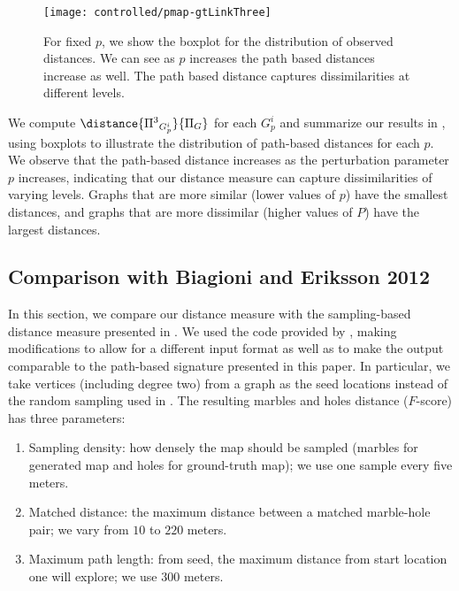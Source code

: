 \begin{figure}[ht]
\centering
\texttt{[image: controlled/pmap-gtLinkThree]}
\caption{For fixed $p$, we show the boxplot for the
distribution of observed distances. We can see as $p$ increases the path based
distances increase as well. The path based distance captures dissimilarities at
different levels.
\label{fig-controlled_result}}
\end{figure}
We compute $\distance{{\Pi^3}_{G_p^i}}{\Pi_G}$ for each $G_p^i$ and  summarize
our results in , using boxplots to illustrate the
distribution of path-based distances for each $p$. We observe that
the path-based 
distance   increases as the perturbation parameter $p$ increases, indicating 
that our distance measure can capture dissimilarities of varying
levels. Graphs that are more similar (lower values of $p$) have the smallest distances, and graphs that are more dissimilar (higher values of $P$) have the largest distances. 










\subsection{Comparison with {Biagioni and Eriksson 2012}}
\label{subsec-comparejames}
In this section, we compare our distance measure with the sampling-based
distance measure presented in
.  We used the code provided
by , making
modifications to allow for a different input format as well as to make the
output comparable to the path-based signature presented in this
paper.  In particular, we take vertices (including degree
two) from a graph as the seed locations
instead of the random sampling used in \cite{Biagioni:2012:MIF:2424321.2424333}.
The resulting marbles and holes distance ($F$-score) has three
parameters:
\begin{enumerate}
\item{ Sampling density: how densely the map should be sampled (marbles for
generated map and holes for ground-truth
    map); we use one sample every five meters.}
\item{ Matched distance: the maximum distance between a matched marble-hole
pair; we vary from $10$ to $220$ meters.}
\item{ Maximum path length: from seed, the maximum distance from start location
one will explore; we use $300$ meters.}
\end{enumerate}

